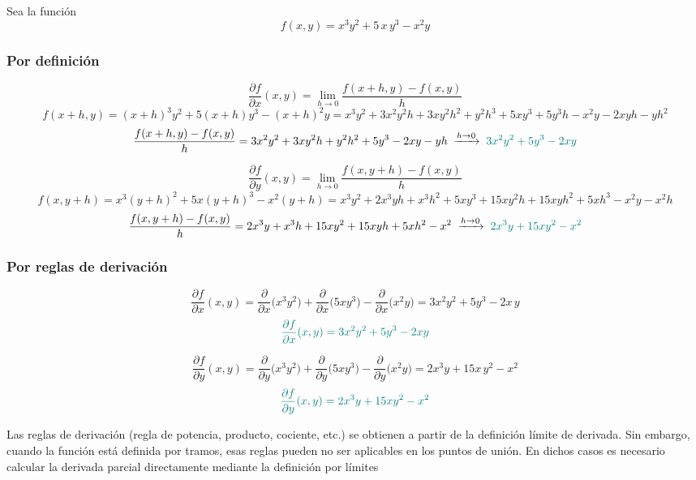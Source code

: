 \documentclass{article}
\begin{document}
Sea la función  
\[
f(x,y)=x^{3}y^{2} + 5\,x\,y^{3} - x^{2}y
\]



\subsubsection*{Por definición}

\[
\frac{\partial f}{\partial x}(x,y)
=
\lim_{h\to0}
\frac{f(x+h,y)-f(x,y)}{h}
\]
\[
f(x+h,y)
=(x+h)^{3}y^{2} + 5(x+h)y^{3} - (x+h)^{2}y
= x^{3}y^{2} + 3x^{2}y^{2}h + 3xy^{2}h^{2} + y^{2}h^{3}
+5xy^{3} +5y^{3}h
- x^{2}y -2xyh - yh^{2}
\]
\[
\frac{f(x+h,y)-f(x,y)}{h}
=3x^{2}y^{2} +3xy^{2}h +y^{2}h^{2} +5y^{3} -2xy - yh
\;\xrightarrow{h\to0}\;
\color{teal}
3x^{2}y^{2} +5y^{3} -2xy
\]

\[
\frac{\partial f}{\partial y}(x,y)
=
\lim_{h\to0}
\frac{f(x,y+h)-f(x,y)}{h}
\]
\[
f(x,y+h)
=x^{3}(y+h)^{2} +5x(y+h)^{3} - x^{2}(y+h)
= x^{3}y^{2} +2x^{3}yh +x^{3}h^{2}
+5xy^{3} +15xy^{2}h +15xyh^{2} +5xh^{3}
- x^{2}y - x^{2}h
\]
\[
\frac{f(x,y+h)-f(x,y)}{h}
=2x^{3}y +x^{3}h +15xy^{2} +15xyh +5xh^{2} -x^{2}
\;\xrightarrow{h\to0}\;
\color{teal}
2x^{3}y +15xy^{2} - x^{2}
\]



\subsubsection*{Por reglas de derivación}
\[
\frac{\partial f}{\partial x}(x,y)
=\frac{\partial}{\partial x}\bigl(x^{3}y^{2}\bigr)
+\frac{\partial}{\partial x}\bigl(5xy^{3}\bigr)
-\frac{\partial}{\partial x}\bigl(x^{2}y\bigr)
=3x^{2}y^{2} + 5y^{3} - 2x\,y
\]
\[
\color{teal}
\frac{\partial f}{\partial x}(x,y)
=3x^{2}y^{2} + 5y^{3} - 2xy
\]

\[
\frac{\partial f}{\partial y}(x,y)
=\frac{\partial}{\partial y}\bigl(x^{3}y^{2}\bigr)
+\frac{\partial}{\partial y}\bigl(5xy^{3}\bigr)
-\frac{\partial}{\partial y}\bigl(x^{2}y\bigr)
=2x^{3}y + 15x\,y^{2} - x^{2}
\]
\[
\color{teal}
\frac{\partial f}{\partial y}(x,y)
=2x^{3}y + 15xy^{2} - x^{2}
\]



Las reglas de derivación (regla de potencia, producto, cociente, etc.) se obtienen a partir de la definición límite de derivada. Sin embargo, cuando la función está definida por tramos, esas reglas pueden no ser aplicables en los puntos de unión. En dichos casos es necesario calcular la derivada parcial directamente mediante la definición por límites
\end{document}
